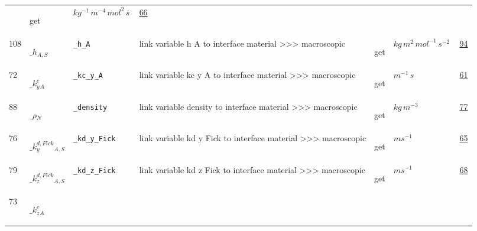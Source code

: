 \begin{longtable}{|p{1cm}|p{2.5cm}|p{4.5cm}|p{8cm}|p{3.0cm}|p{3cm}|p{1cm}|}
             & \begin{lay}get \end{lay}
             & $ kg^{-1} \,m^{-4} \,mol^{2} \,s \, $
             &                 \hyperlink{"e:66"}{ 66 }
                 \\
            108
             & \hypertarget{"v:108"}{ $ {{\_h}}{_{A, S}} $}
             & \verb|_h_A|
             & link variable h A to interface material >>> macroscopic
             & \begin{lay}get \end{lay}
             & $ kg \,m^{2} \,mol^{-1} \,s^{-2} \, $
             &                 \hyperlink{"e:94"}{ 94 }
                 \\
            72
             & \hypertarget{"v:72"}{ $ {{\_k^c_y}}{_{A}} $}
             & \verb|_kc_y_A|
             & link variable kc y A to interface material >>> macroscopic
             & \begin{lay}get \end{lay}
             & $ m^{-1} \,s \, $
             &                 \hyperlink{"e:61"}{ 61 }
                 \\
            88
             & \hypertarget{"v:88"}{ $ {{\_\rho}}{_{N}} $}
             & \verb|_density|
             & link variable density to interface material >>> macroscopic
             & \begin{lay}get \end{lay}
             & $ kg \,m^{-3} \, $
             &                 \hyperlink{"e:77"}{ 77 }
                 \\
            76
             & \hypertarget{"v:76"}{ $ {{\_k^{d,Fick}_y}}{_{A, S}} $}
             & \verb|_kd_y_Fick|
             & link variable kd y Fick to interface material >>> macroscopic
             & \begin{lay}get \end{lay}
             & $ m s^{-1} \, $
             &                 \hyperlink{"e:65"}{ 65 }
                 \\
            79
             & \hypertarget{"v:79"}{ $ {{\_k^{d,Fick}_z}}{_{A, S}} $}
             & \verb|_kd_z_Fick|
             & link variable kd z Fick to interface material >>> macroscopic
             & \begin{lay}get \end{lay}
             & $ m s^{-1} \, $
             &                 \hyperlink{"e:68"}{ 68 }
                 \\
            73
             & \hypertarget{"v:73"}{ $ {{\_k^c_z}}{_{A}} $}

\end{longtable}

